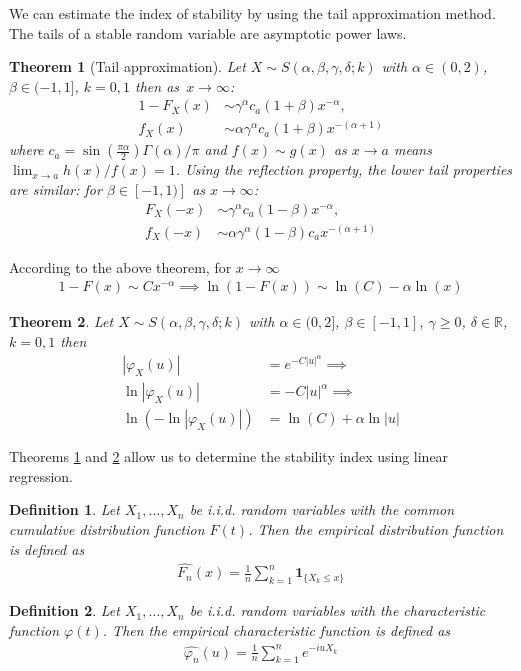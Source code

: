 \documentclass{article}
\newtheorem{theorem}{Theorem}
\newtheorem{definition}{Definition}
\begin{document}
        We can estimate the index of stability by using the tail approximation method.
		The tails of a stable random variable are asymptotic power laws. 
			\begin{theorem}[Tail approximation] Let $X \sim S(\alpha, \beta , \gamma, \delta; k)$ with $\alpha \in (0,2)$, $\beta \in (-1,1]$, $k=0,1$ then as~$x\to \infty$:
			\label{theorem:Tail approximation}
			\begin{align*}
				1 - F_X(x) &\sim \gamma^\alpha c_a (1+\beta)x^{-\alpha},\\
				f_X(x) &\sim \alpha \gamma^\alpha c_a (1+\beta) x^{-(\alpha + 1)}
			\end{align*}
			where $c_a = \sin(\frac{\pi\alpha}{2})\Gamma(\alpha)/\pi$ and $f(x)\sim g(x)$ as $x\to a$ means $\lim_{x\to a} h(x)/f(x) = 1$. Using the reflection property, the lower tail properties are
			similar: for $\beta\in[-1,1)]$ as $x \to \infty$:
			\begin{align*}
				F_X(-x) &\sim  \gamma^\alpha c_a (1-\beta)x^{-\alpha},\\
				f_X(-x) &\sim  \alpha \gamma^\alpha (1-\beta)c_a x^{-(\alpha + 1)}
			\end{align*}
		\end{theorem}
		According to the above theorem, for $x\to\infty$
		\begin{gather}\label{Tail approximation polifit}
			1 - F(x) \sim Cx^{-\alpha} \implies \ln(1-F(x)) \sim \ln(C) -\alpha \ln(x)
		\end{gather}

		\begin{theorem}  Let $X \sim S(\alpha, \beta , \gamma, \delta; k)$ with $\alpha \in (0,2]$, $\beta \in [-1,1]$, $\gamma \ge 0$, $\delta\in\mathbb{R}$, $k=0,1$ then
			\label{theorem:CF}
			\begin{align*}
				|\varphi_X(u)| &= e^{-C|u|^\alpha} \implies \\
				\ln |\varphi_X(u)| &= -C|u|^\alpha \implies \\
				\ln(-\ln |\varphi_X(u)|) &= \ln(C) + \alpha\ln|u|
			\end{align*}
		\end{theorem}
		Theorems \ref{theorem:Tail approximation} and \ref{theorem:CF} allow us to determine the stability index using linear regression.

		\begin{definition}Let $X_1,\dots, X_n$ be i.i.d. random variables with the common cumulative distribution function $F(t)$. 
			Then the empirical distribution function is defined as
			\begin{gather*}
				\hat{F_n}(x) = \frac{1}{n}\sum_{k = 1}^{n}\mathbf{1}_{\{X_k \le x\}}
			\end{gather*}
		\end{definition}
		\begin{definition}Let $X_1,\dots, X_n$ be i.i.d. random variables with the characteristic function $\varphi(t)$. 
			Then the empirical characteristic function is defined as
			\begin{gather*}
				\hat{\varphi_n}(u) = \frac{1}{n}\sum_{k = 1}^{n}e^{-i u X_k}
			\end{gather*}
		\end{definition}
\end{document}
